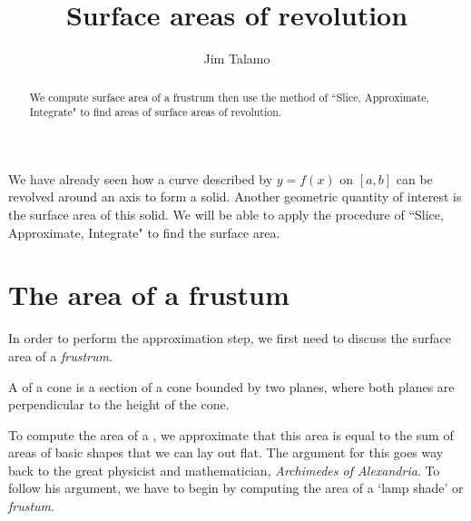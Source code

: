 \documentclass{ximera}
\author{Jim Talamo}
\title[Dig-In:]{Surface areas of revolution}
\begin{document}
\begin{abstract}
We compute surface area of a frustrum then use the method of ``Slice, Approximate, Integrate" to find areas of surface areas of revolution.
\end{abstract}
\maketitle


We have already seen how a curve described by $y=f(x)$ on $[a,b]$ can be revolved around an axis to form a solid. Another geometric quantity of interest is the surface area of this solid.  We will be able to apply the procedure of ``Slice, Approximate, Integrate" to find the surface area. 
\section{The area of a frustum}
 In order to perform the approximation step, we first need to discuss the surface area of a \emph{frustrum}.

\begin{definition}
  A  of a cone is a section of a cone bounded by two
  planes, where both planes are perpendicular to the height of the
  cone.


To compute the area of a , we approximate that this area is equal to the sum of areas of basic shapes  that we can lay out flat. The argument for this goes way back to the great physicist and mathematician, \textit{Archimedes of Alexandria}. To follow his argument, we have to begin by computing the area of a `lamp shade' or \textit{frustum}.

  \begin{image}[1in]
  \end{image}
\end{definition}
\end{document}
